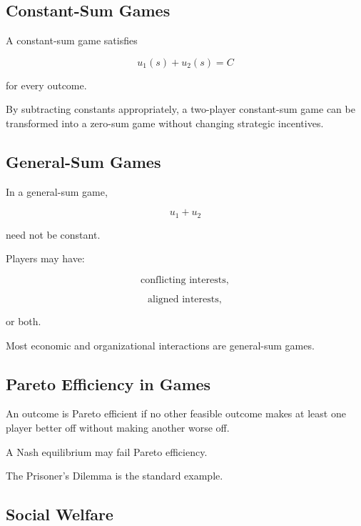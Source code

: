 \subsection{Constant-Sum Games}
\label{subsec:constant-sum-games}

A constant-sum game satisfies

\[
\boxed{
u_1(s)+u_2(s)=C
}
\]

for every outcome.

By subtracting constants appropriately, a two-player constant-sum game can
be transformed into a zero-sum game without changing strategic incentives.

\subsection{General-Sum Games}
\label{subsec:general-sum-games}

In a general-sum game,

\[
u_1+u_2
\]

need not be constant.

Players may have:

\[
\boxed{
\text{conflicting interests},
}
\]

\[
\boxed{
\text{aligned interests},
}
\]

or both.

Most economic and organizational interactions are general-sum games.

\subsection{Pareto Efficiency in Games}
\label{subsec:pareto-efficiency-games}

An outcome is Pareto efficient if no other feasible outcome makes at least
one player better off without making another worse off.

A Nash equilibrium may fail Pareto efficiency.

The Prisoner's Dilemma is the standard example.

\subsection{Social Welfare}
\label{subsec:social-welfare-games}

